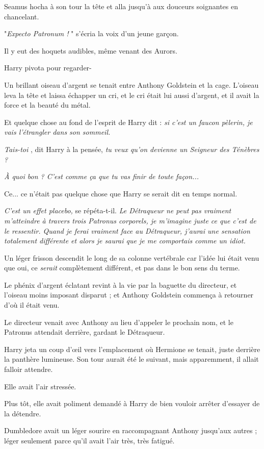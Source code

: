 Seamus hocha à son tour la tête et alla jusqu'à aux douceurs soignantes en chancelant.

"\emph{Expecto Patronum !} " s'écria la voix d'un jeune garçon.

Il y eut des hoquets audibles, même venant des Aurors.

Harry pivota pour regarder-

Un brillant oiseau d'argent se tenait entre Anthony Goldstein et la cage. L'oiseau leva la tête et laissa échapper un cri, et le cri était lui aussi d'argent, et il avait la force et la beauté du métal.

Et quelque chose au fond de l'esprit de Harry dit : \emph{si c'est un faucon pèlerin, je vais l'étrangler dans son sommeil.} 

\emph{Tais-toi} , dit Harry à la pensée, \emph{tu veux qu'on devienne un Seigneur des Ténèbres ?} 

\emph{À quoi bon ? C'est comme ça que tu vas finir de toute façon...} 

Ce... ce n'était pas quelque chose que Harry se serait dit en temps normal.

\emph{C'est un effet placebo, } se répéta-t-il. \emph{Le Détraqueur ne peut pas vraiment m'atteindre à travers trois Patronus corporels, je m'imagine juste ce que c'est de le ressentir. Quand je ferai vraiment face au Détraqueur, j'aurai une sensation totalement différente et alors je saurai que je me comportais comme un idiot.} 

Un léger frisson descendit le long de sa colonne vertébrale car l'idée lui était venu que oui, ce \emph{serait}  complètement différent, et pas dans le bon sens du terme.

Le phénix d'argent éclatant revint à la vie par la baguette du directeur, et l'oiseau moins imposant disparut ; et Anthony Goldstein commença à retourner d'où il était venu.

Le directeur venait avec Anthony au lieu d'appeler le prochain nom, et le Patronus attendait derrière, gardant le Détraqueur.

Harry jeta un coup d'œil vers l'emplacement où Hermione se tenait, juste derrière la panthère lumineuse. Son tour aurait été le suivant, mais apparemment, il allait falloir attendre.

Elle avait l'air stressée.

Plus tôt, elle avait poliment demandé à Harry de bien vouloir arrêter d'essayer de la détendre.

Dumbledore avait un léger sourire en raccompagnant Anthony jusqu'aux autres ; léger seulement parce qu'il avait l'air très, très fatigué.

